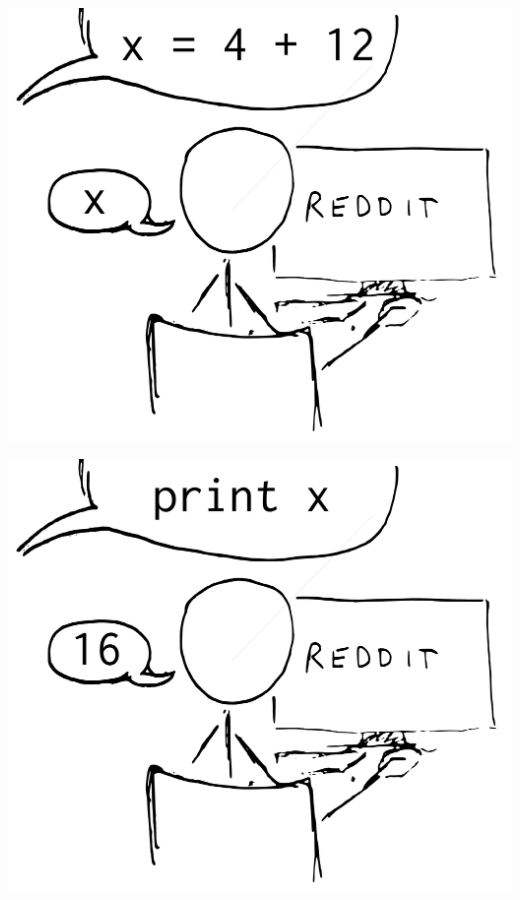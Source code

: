 \documentclass[20pt]{beamer}
\begin{document}
\begin{frame}[plain]
    \begin{center}
    \includegraphics[height=0.9\textheight]{images/reddit-binding.pdf}
    \end{center}
\end{frame}

\begin{frame}[plain]
    \begin{center}
    \includegraphics[height=0.9\textheight]{images/reddit-eval.pdf}
    \end{center}
\end{frame}
\end{document}
